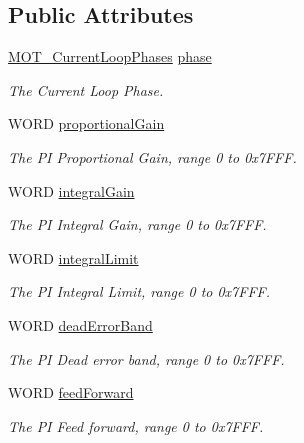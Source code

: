\subsection*{Public Attributes}
\begin{DoxyCompactItemize}
\item 
\hyperlink{group___common_gab2d264a3167428788845f683b62cf9ef}{M\+O\+T\+\_\+\+Current\+Loop\+Phases} \hyperlink{struct_m_o_t___brushless_current_loop_parameters_aa3065d51d30f7241d8ad6a7679bda63a}{phase}
\begin{DoxyCompactList}\small\item\em The Current Loop Phase. \end{DoxyCompactList}\item 
W\+O\+RD \hyperlink{struct_m_o_t___brushless_current_loop_parameters_a27542e753d8b6f8fb09747133d1f772e}{proportional\+Gain}
\begin{DoxyCompactList}\small\item\em The PI Proportional Gain, range 0 to 0x7\+F\+FF. \end{DoxyCompactList}\item 
W\+O\+RD \hyperlink{struct_m_o_t___brushless_current_loop_parameters_aee0a51f6021b8b48e9fd312f2ba9b356}{integral\+Gain}
\begin{DoxyCompactList}\small\item\em The PI Integral Gain, range 0 to 0x7\+F\+FF. \end{DoxyCompactList}\item 
W\+O\+RD \hyperlink{struct_m_o_t___brushless_current_loop_parameters_a224e0bd654a301050e9390c667b7fd9b}{integral\+Limit}
\begin{DoxyCompactList}\small\item\em The PI Integral Limit, range 0 to 0x7\+F\+FF. \end{DoxyCompactList}\item 
W\+O\+RD \hyperlink{struct_m_o_t___brushless_current_loop_parameters_ac7bbd26dcb62055c57288e390483c2d9}{dead\+Error\+Band}
\begin{DoxyCompactList}\small\item\em The PI Dead error band, range 0 to 0x7\+F\+FF. \end{DoxyCompactList}\item 
W\+O\+RD \hyperlink{struct_m_o_t___brushless_current_loop_parameters_a4818f26588bda6bda4524189df13c82d}{feed\+Forward}
\begin{DoxyCompactList}\small\item\em The PI Feed forward, range 0 to 0x7\+F\+FF. \end{DoxyCompactList}\item 

\end{DoxyCompactItemize}
